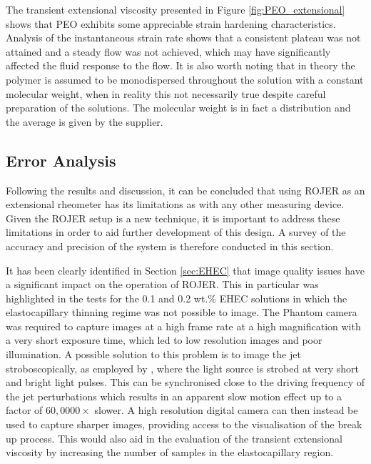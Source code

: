 \documentclass[11pt]{article}
\begin{document}
The transient extensional viscosity presented in Figure 
\ref{fig:PEO_extensional} shows that PEO exhibits some appreciable strain 
hardening characteristics. Analysis of the instantaneous strain rate shows that 
a consistent plateau was not attained and a steady flow was not achieved, which 
may have significantly affected the fluid response to the flow. It is also 
worth noting that in theory the polymer is assumed to be monodispersed 
throughout the solution with a constant molecular weight, when in reality this 
not necessarily true despite careful preparation of the solutions. The 
molecular weight is in fact a distribution and the average is given by the 
supplier.

\subsection{Error Analysis} \label{sec:error}
Following the results and discussion, it can be concluded that using ROJER as 
an extensional rheometer has its limitations as with any other measuring 
device. Given the ROJER setup is a new technique, it is important to address 
these limitations in order to aid further development of this design. A survey 
of the accuracy and precision of the system is therefore conducted in this 
section.

It has been clearly identified in Section \ref{sec:EHEC} that image quality 
issues have a significant impact on the operation of ROJER. This in particular 
was highlighted in the tests for the 0.1 and 0.2 wt.\% EHEC solutions in which 
the elastocapillary thinning regime was not possible to image. The Phantom 
camera was required to capture images at a high frame rate at a high 
magnification with a very short exposure time, which led to low resolution 
images and poor illumination. A possible solution to this problem is to image 
the jet stroboscopically, as employed by \cite{keshavarz2015studying}, where 
the light source is strobed at very short and bright light pulses. This can be 
synchronised close to the driving frequency of the jet perturbations which 
results in an apparent slow motion effect up to a factor of $60,0000 \times$ 
slower. A high resolution digital camera can then instead be used to capture 
sharper images, providing access to the visualisation of the break up process. 
This would also aid in the evaluation of the transient extensional viscosity by 
increasing the number of samples in the elastocapillary region.
\end{document}

